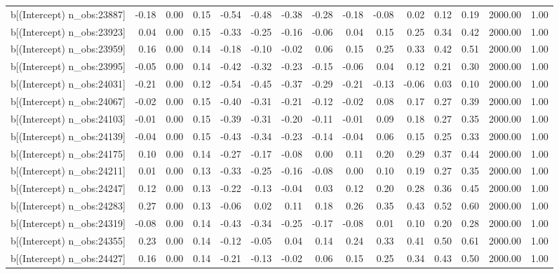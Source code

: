 \begin{table}[ht]
\begin{tabular}{rrrrrrrrrrrrrrr}
  b[(Intercept) n\_obs:23887] & -0.18 & 0.00 & 0.15 & -0.54 & -0.48 & -0.38 & -0.28 & -0.18 & -0.08 & 0.02 & 0.12 & 0.19 & 2000.00 & 1.00 \\ 
  b[(Intercept) n\_obs:23923] & 0.04 & 0.00 & 0.15 & -0.33 & -0.25 & -0.16 & -0.06 & 0.04 & 0.15 & 0.25 & 0.34 & 0.42 & 2000.00 & 1.00 \\ 
  b[(Intercept) n\_obs:23959] & 0.16 & 0.00 & 0.14 & -0.18 & -0.10 & -0.02 & 0.06 & 0.15 & 0.25 & 0.33 & 0.42 & 0.51 & 2000.00 & 1.00 \\ 
  b[(Intercept) n\_obs:23995] & -0.05 & 0.00 & 0.14 & -0.42 & -0.32 & -0.23 & -0.15 & -0.06 & 0.04 & 0.12 & 0.21 & 0.30 & 2000.00 & 1.00 \\ 
  b[(Intercept) n\_obs:24031] & -0.21 & 0.00 & 0.12 & -0.54 & -0.45 & -0.37 & -0.29 & -0.21 & -0.13 & -0.06 & 0.03 & 0.10 & 2000.00 & 1.00 \\ 
  b[(Intercept) n\_obs:24067] & -0.02 & 0.00 & 0.15 & -0.40 & -0.31 & -0.21 & -0.12 & -0.02 & 0.08 & 0.17 & 0.27 & 0.39 & 2000.00 & 1.00 \\ 
  b[(Intercept) n\_obs:24103] & -0.01 & 0.00 & 0.15 & -0.39 & -0.31 & -0.20 & -0.11 & -0.01 & 0.09 & 0.18 & 0.27 & 0.35 & 2000.00 & 1.00 \\ 
  b[(Intercept) n\_obs:24139] & -0.04 & 0.00 & 0.15 & -0.43 & -0.34 & -0.23 & -0.14 & -0.04 & 0.06 & 0.15 & 0.25 & 0.33 & 2000.00 & 1.00 \\ 
  b[(Intercept) n\_obs:24175] & 0.10 & 0.00 & 0.14 & -0.27 & -0.17 & -0.08 & 0.00 & 0.11 & 0.20 & 0.29 & 0.37 & 0.44 & 2000.00 & 1.00 \\ 
  b[(Intercept) n\_obs:24211] & 0.01 & 0.00 & 0.13 & -0.33 & -0.25 & -0.16 & -0.08 & 0.00 & 0.10 & 0.19 & 0.27 & 0.35 & 2000.00 & 1.00 \\ 
  b[(Intercept) n\_obs:24247] & 0.12 & 0.00 & 0.13 & -0.22 & -0.13 & -0.04 & 0.03 & 0.12 & 0.20 & 0.28 & 0.36 & 0.45 & 2000.00 & 1.00 \\ 
  b[(Intercept) n\_obs:24283] & 0.27 & 0.00 & 0.13 & -0.06 & 0.02 & 0.11 & 0.18 & 0.26 & 0.35 & 0.43 & 0.52 & 0.60 & 2000.00 & 1.00 \\ 
  b[(Intercept) n\_obs:24319] & -0.08 & 0.00 & 0.14 & -0.43 & -0.34 & -0.25 & -0.17 & -0.08 & 0.01 & 0.10 & 0.20 & 0.28 & 2000.00 & 1.00 \\ 
  b[(Intercept) n\_obs:24355] & 0.23 & 0.00 & 0.14 & -0.12 & -0.05 & 0.04 & 0.14 & 0.24 & 0.33 & 0.41 & 0.50 & 0.61 & 2000.00 & 1.00 \\ 
  b[(Intercept) n\_obs:24427] & 0.16 & 0.00 & 0.14 & -0.21 & -0.13 & -0.02 & 0.06 & 0.15 & 0.25 & 0.34 & 0.43 & 0.50 & 2000.00 & 1.00 \\ 

\end{tabular}
\end{table}

